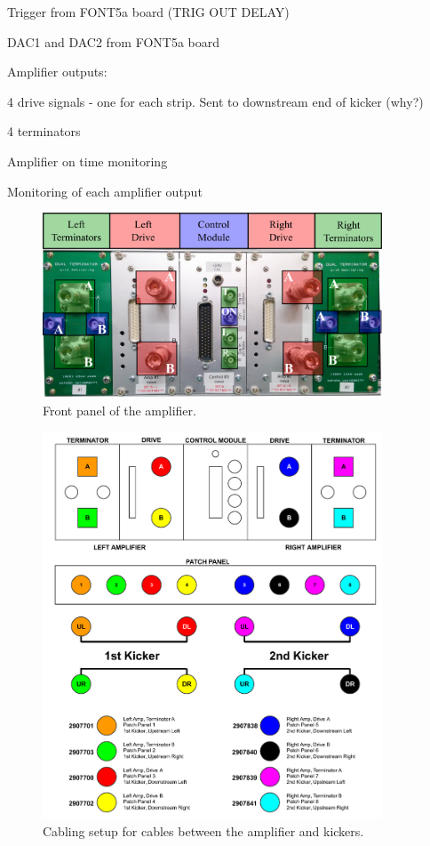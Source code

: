 Trigger from FONT5a board (TRIG OUT DELAY)

DAC1 and DAC2 from FONT5a board


Amplifier outputs:

4 drive signals - one for each strip. Sent to downstream end of kicker (why?)

4 terminators

Amplifier on time monitoring

Monitoring of each amplifier output

\begin{figure}
  \centering
  \includegraphics[width=0.9\textwidth]{Figures/commissioning/AmplifierPanelPic}
  \caption{Front panel of the amplifier.}
  \label{f:AmplifierPanelPic}
\end{figure}


\begin{figure}
  \centering
  \includegraphics[width=0.9\textwidth]{Figures/commissioning/kickerCables}
  \caption{Cabling setup for cables between the amplifier and kickers.}
  \label{f:kickerCables}
\end{figure}


